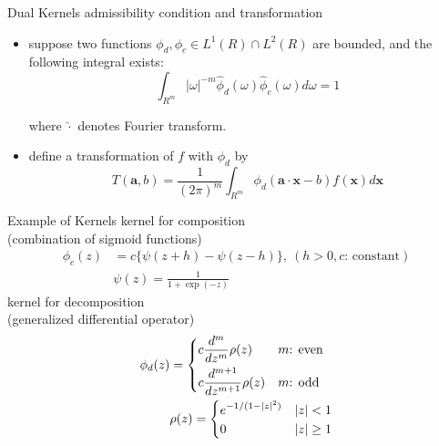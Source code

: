 \documentclass[fleqn,aspectratio=1610]{beamer}
\begin{document}
\begin{frame}[label={sec:orgb8a3e0a}]{Dual Kernels}
\alert{admissibility condition} and \alert{transformation}
\begin{itemize}
\item suppose two functions \(\phi_{d},\phi_{c}\in L^{1}(R)\cap
  L^{2}(R)\) are bounded, and the following integral exists:
\begin{equation}
  \int_{R^{m}}|\omega|^{-m}
  \hat\phi_{d}(\omega)\hat\phi_{c}(\omega)d\omega=1%
\end{equation}

where \(\hat\cdot\) denotes Fourier transform.
\item define a transformation of \(f\) with \(\phi_{d}\) by
\begin{equation}
  T(\boldsymbol{a},b)
  =\frac{1}{(2\pi)^{m}}
  \int_{R^{m}}\phi_{d}(\boldsymbol{a}\cdot\boldsymbol{x}-b)
  f(\boldsymbol{x})d\boldsymbol{x}
\end{equation}
\end{itemize}
\end{frame}

\begin{frame}[label={sec:org98816b7}]{Example of Kernels}
\alert{kernel for composition}\\[0pt]
(combination of sigmoid functions)
\begin{align}
  \phi_{c}(z)
  &=c\{\psi(z+h)-\psi(z-h)\},\ (h>0,\text{\(c\): constant})\\
  &\psi(z)=\frac{1}{1+\exp(-z)}
\end{align}
\alert{kernel for decomposition}\\[0pt]
(generalized differential operator)
\begin{align}
  \phi_{d}(z)
  &=
    \begin{dcases}
      c\frac{d^{m}}{dz^{m}}\rho(z)& \text{\(m\): even}\\
      c\frac{d^{m+1}}{dz^{m+1}}\rho(z)& \text{\(m\): odd}
    \end{dcases}\\
  &\rho(z)=
    \begin{dcases}
      e^{-1/(1-|z|^2)}& |z|<1\\
      0 & |z|\geq1
    \end{dcases}
\end{align}
\end{frame}
\end{document}

